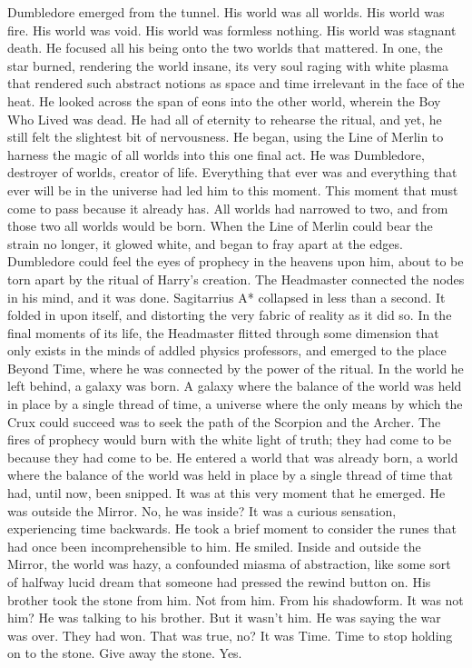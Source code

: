 Dumbledore emerged from the tunnel. His world was all worlds. His world was fire. His world was void. His world was formless nothing. His world was stagnant death. He focused all his being onto the two worlds that mattered. In one, the star burned, rendering the world insane, its very soul raging with white plasma that rendered such abstract notions as space and time irrelevant in the face of the heat.
\SmallVSpace
He looked across the span of eons into the other world, wherein the Boy Who Lived was dead.
\SmallVSpace
He had all of eternity to rehearse the ritual, and yet, he still felt the slightest bit of nervousness. He began, using the Line of Merlin to harness the magic of all worlds into this one final act. He was Dumbledore, destroyer of worlds, creator of life. Everything that ever was and everything that ever will be in the universe had led him to this moment. This moment that must come to pass because it already has.
\SomeVSpace
\SomeVSpace
All worlds had narrowed to two, and from those two all worlds would be born. When the Line of Merlin could bear the strain no longer, it glowed white, and began to fray apart at the edges. Dumbledore could feel the eyes of prophecy in the heavens upon him, about to be torn apart by the ritual of Harry’s creation. The Headmaster connected the nodes in his mind, and it was done.
\SmallVSpace
Sagitarrius A* collapsed in less than a second. It folded in upon itself, and distorting the very fabric of reality as it did so. In the final moments of its life, the Headmaster flitted through some dimension that only exists in the minds of addled physics professors, and emerged to the place Beyond Time, where he was connected by the power of the ritual.
\SmallVSpace
In the world he left behind, a galaxy was born. A galaxy where the balance of the world was held in place by a single thread of time, a universe where the only means by which the Crux could succeed was to seek the path of the Scorpion and the Archer. The fires of prophecy would burn with the white light of truth; they had come to be because they had come to be.
\SmallVSpace
He entered a world that was already born, a world where the balance of the world was held in place by a single thread of time that had, until now, been snipped. It was at this very moment that he emerged. He was outside the Mirror. No, he was inside? It was a curious sensation, experiencing time backwards. He took a brief moment to consider the runes that had once been incomprehensible to him. He smiled.
\SmallVSpace
Inside and outside the Mirror, the world was hazy, a confounded miasma of abstraction, like some sort of halfway lucid dream that someone had pressed the rewind button on. His brother took the stone from him. Not from him. From his shadowform. It was not him?  He was talking to his brother. But it wasn’t him. He was saying the war was over. They had won. That was true, no? It was Time. Time to stop holding on to the stone. Give away the stone. Yes.

